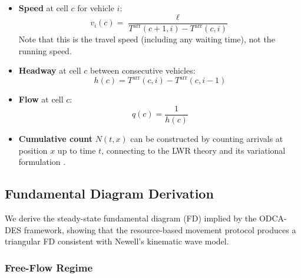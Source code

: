 \documentclass[review,authoryear]{elsarticle}
\newcommand{\Tarr}{T^{\text{arr}}}
\begin{document}
\begin{itemize}
    \item \textbf{Speed} at cell $c$ for vehicle $i$:
    \begin{equation}
        v_i(c) = \frac{\ell}{\Tarr(c+1, i) - \Tarr(c, i)}
        \label{eq:speed_from_T}
    \end{equation}
    Note that this is the travel speed (including any waiting time), not the running speed.

    \item \textbf{Headway} at cell $c$ between consecutive vehicles:
    \begin{equation}
        h(c) = \Tarr(c, i) - \Tarr(c, i-1)
        \label{eq:headway_from_T}
    \end{equation}

    \item \textbf{Flow} at cell $c$:
    \begin{equation}
        q(c) = \frac{1}{h(c)}
        \label{eq:flow_from_T}
    \end{equation}

    \item \textbf{Cumulative count} $N(t, x)$ can be constructed by counting arrivals at position $x$ up to time $t$, connecting to the LWR theory \citep{lighthill1955kinematic, richards1956shock} and its variational formulation \citep{daganzo2005variational}.
\end{itemize}

\subsection{Fundamental Diagram Derivation}
\label{sec:fd_derivation}

We derive the steady-state fundamental diagram (FD) implied by the ODCA-DES framework, showing that the resource-based movement protocol produces a triangular FD consistent with Newell's kinematic wave model.

\subsubsection{Free-Flow Regime}
\end{document}

